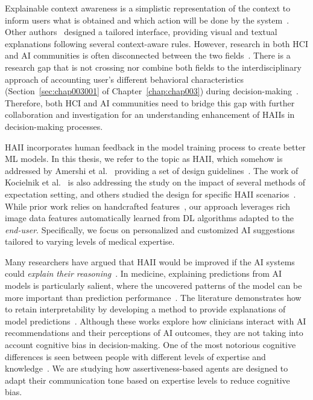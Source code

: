 Explainable context awareness is a simplistic representation of the context to inform users what is obtained and which action will be done by the system~\cite{10.1145/3313831.3376545}.
Other authors~\cite{Kocielnik:2019:YAI:3290605.3300641} designed a tailored interface, providing visual and textual explanations following several context-aware rules.
However, research in both \ac{HCI} and \ac{AI} communities is often disconnected between the two fields~\cite{10.1145/3173574.3174156, 10.1145/3313831.3376807}.
There is a research gap that is not crossing nor combine both fields to the interdisciplinary approach of accounting user's different behavioral characteristics (Section~\ref{sec:chap003001} of Chapter~\ref{chap:chap003}) during decision-making~\cite{10.1145/3173574.3174156}.
Therefore, both \ac{HCI} and \ac{AI} communities need to bridge this gap with further collaboration and investigation for an understanding enhancement of \acp{HAII} in decision-making processes.

\ac{HAII} incorporates human feedback in the model training process to create better \ac{ML} models.
In this thesis, we refer to the topic as \ac{HAII}, which somehow is addressed by Amershi et al.~\cite{10.1145/3290605.3300233} providing a set of design guidelines~\cite{10.1145/3132272.3134111}.
The work of Kocielnik et al.~\cite{Kocielnik:2019:YAI:3290605.3300641} is also addressing the study on the impact of several methods of expectation setting, and others studied the design for specific \ac{HAII} scenarios~\cite{aha2017ai}.
\textcolor{revised}{While prior work relies on handcrafted features~\cite{10.1145/3290605.3300233, Kocielnik:2019:YAI:3290605.3300641}, our approach leverages rich image data features automatically learned from \ac{DL} algorithms adapted to the {\it end-user}.
Specifically, we focus on personalized and customized \ac{AI} suggestions tailored to varying levels of medical expertise.}

Many researchers have argued that \ac{HAII} would be improved if the \ac{AI} systems could {\it explain their reasoning}~\cite{10.1145/3411764.3445717, Rudin2022, Kawamleh2022}.
In medicine, explaining predictions from \ac{AI} models is particularly salient, where the uncovered patterns of the model can be more important than prediction performance~\cite{Lundberg2020}.
The literature demonstrates how to retain interpretability by developing a method to provide explanations of model predictions~\cite{10.1145/3544548.3580682}.
Although these works explore how clinicians interact with \ac{AI} recommendations and their perceptions of \ac{AI} outcomes, they are not taking into account cognitive bias in decision-making.
One of the most notorious cognitive differences is seen between people with different levels of expertise and knowledge~\cite{https://doi.org/10.1111/nuf.12430, Seidel2021}.
We are studying how assertiveness-based agents are designed to adapt their communication tone based on expertise levels to reduce cognitive bias.


